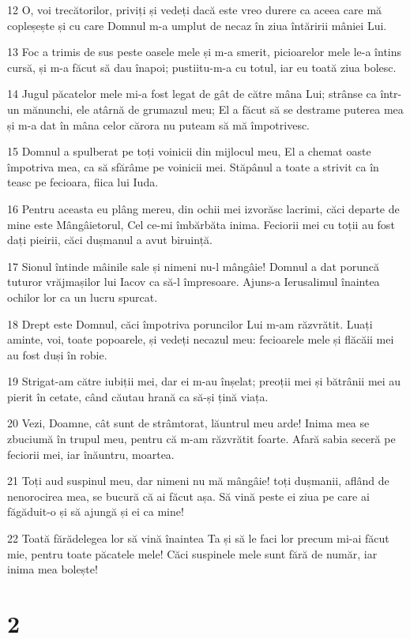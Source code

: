 \par 12 O, voi trecătorilor, priviți și vedeți dacă este vreo durere ca aceea care mă copleșește și cu care Domnul m-a umplut de necaz în ziua întăririi mâniei Lui.
\par 13 Foc a trimis de sus peste oasele mele și m-a smerit, picioarelor mele le-a întins cursă, și m-a făcut să dau înapoi; pustiitu-m-a cu totul, iar eu toată ziua bolesc.
\par 14 Jugul păcatelor mele mi-a fost legat de gât de către mâna Lui; strânse ca într-un mănunchi, ele atârnă de grumazul meu; El a făcut să se destrame puterea mea și m-a dat în mâna celor cărora nu puteam să mă împotrivesc.
\par 15 Domnul a spulberat pe toți voinicii din mijlocul meu, El a chemat oaste împotriva mea, ca să sfărâme pe voinicii mei. Stăpânul a toate a strivit ca în teasc pe fecioara, fiica lui Iuda.
\par 16 Pentru aceasta eu plâng mereu, din ochii mei izvorăsc lacrimi, căci departe de mine este Mângâietorul, Cel ce-mi îmbărbăta inima. Feciorii mei cu toții au fost dați pieirii, căci dușmanul a avut biruință.
\par 17 Sionul întinde mâinile sale și nimeni nu-l mângâie! Domnul a dat poruncă tuturor vrăjmașilor lui Iacov ca să-l împresoare. Ajuns-a Ierusalimul înaintea ochilor lor ca un lucru spurcat.
\par 18 Drept este Domnul, căci împotriva poruncilor Lui m-am răzvrătit. Luați aminte, voi, toate popoarele, și vedeți necazul meu: fecioarele mele și flăcăii mei au fost duși în robie.
\par 19 Strigat-am către iubiții mei, dar ei m-au înșelat; preoții mei și bătrânii mei au pierit în cetate, când căutau hrană ca să-și țină viața.
\par 20 Vezi, Doamne, cât sunt de strâmtorat, lăuntrul meu arde! Inima mea se zbuciumă în trupul meu, pentru că m-am răzvrătit foarte. Afară sabia seceră pe feciorii mei, iar înăuntru, moartea.
\par 21 Toți aud suspinul meu, dar nimeni nu mă mângâie! toți dușmanii, aflând de nenorocirea mea, se bucură că ai făcut așa. Să vină peste ei ziua pe care ai făgăduit-o și să ajungă și ei ca mine!
\par 22 Toată fărădelegea lor să vină înaintea Ta și să le faci lor precum mi-ai făcut mie, pentru toate păcatele mele! Căci suspinele mele sunt fără de număr, iar inima mea bolește!

\chapter{2}

